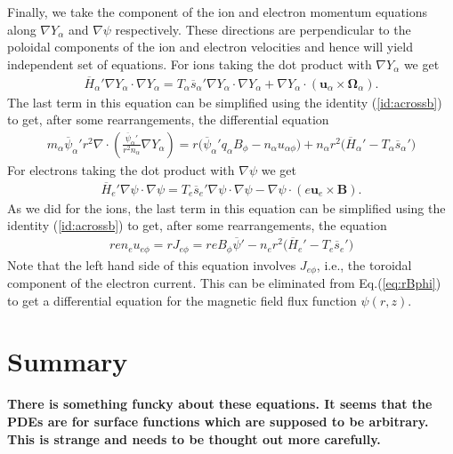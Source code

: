 \documentclass[11pt, reqno]{amsart}
\newcommand{\eqr}[1]{Eq.\thinspace(#1)}
\newcommand{\mvec}[1]{\mathbf{#1}}
\theoremstyle{definition}
\begin{document}
Finally, we take the component of the ion and electron momentum
equations along $\nabla Y_\alpha$ and $\nabla \psi$
respectively. These directions are perpendicular to the poloidal
components of the ion and electron velocities and hence will yield
independent set of equations. For ions taking the dot product with
$\nabla Y_\alpha$ we get
\begin{align}
  \overline{H}_\alpha' \nabla Y_\alpha \cdot \nabla Y_\alpha
  = T_\alpha \overline{s}_\alpha' \nabla Y_\alpha \cdot \nabla Y_\alpha
  +
  \nabla Y_\alpha \cdot (\mvec{u}_\alpha\times\mvec{\Omega}_\alpha).
\end{align}
The last term in this equation can be simplified using the identity
(\ref{id:acrossb}) to get, after some rearrangements, the differential
equation
\begin{align}
  m_\alpha\overline{\psi}_\alpha' 
  r^2\nabla\cdot
  \left(
    \frac{\overline{\psi}_\alpha'}{r^2 n_\alpha}\nabla Y_\alpha
  \right)
  =
  r\big(
  \overline{\psi}_\alpha' q_\alpha  B_\phi - n_\alpha u_{\alpha\phi}
  \big)
  + n_\alpha r^2 \big(
  \overline{H}_\alpha' - T_\alpha \overline{s}_\alpha'
  \big)
\end{align}
For electrons taking the dot product with $\nabla \psi$ we get
\begin{align}
  \overline{H}_e' \nabla \psi \cdot \nabla \psi
  = T_e \overline{s}_e' \nabla \psi \cdot \nabla \psi
  -
  \nabla \psi \cdot ( e \mvec{u}_e\times\mvec{B}).
\end{align}
As we did for the ions, the last term in this equation can be
simplified using the identity (\ref{id:acrossb}) to get, after some
rearrangements, the equation
\begin{align}
  r en_e u_{e\phi} = r J_{e\phi} =
  reB_\phi\overline{\psi}'
  -
  n_e r^2
  \big(
  \overline{H}_e' - T_e \overline{s}_e'  
  \big)
\end{align}
Note that the left hand side of this equation involves $J_{e\phi}$,
i.e., the toroidal component of the electron current. This can be
eliminated from \eqr{\ref{eq:rBphi}} to get a differential equation
for the magnetic field flux function $\psi(r,z)$.

\section{Summary}

{\bf There is something funcky about these equations. It seems that
  the PDEs are for surface functions which are supposed to be
  arbitrary. This is strange and needs to be thought out more
  carefully.}
\end{document}
